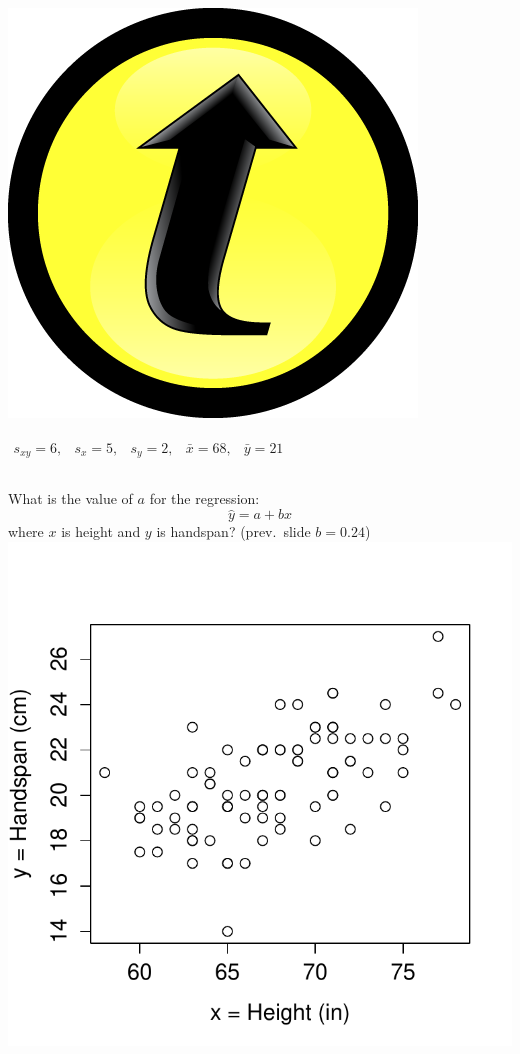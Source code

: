 \documentclass[handout]{beamer}
\begin{document}
\begin{frame}
\frametitle{\includegraphics[scale = 0.05]{./images/clicker}}
$\begin{array}{ccccc} s_{xy} = 6,&s_x = 5,& s_y = 2,& \bar{x} = 68,& \bar{y} = 21\end{array}$
\begin{columns}[c]
\column{2.5in}
What is the value of $a$ for the regression: $$\hat{y}=a+bx$$
where $x$ is height and $y$ is handspan? (prev.\ slide $b = 0.24$)
\column{1.8in}
\includegraphics[scale = 0.4]{./images/height_handspan1}
\end{columns}
\alert{$$\phantom{a = \bar{y} - b \bar{x} = 20.6 - 0.297 \times 67.6 \approx 0.5}$$}
\end{frame}
\end{document}
